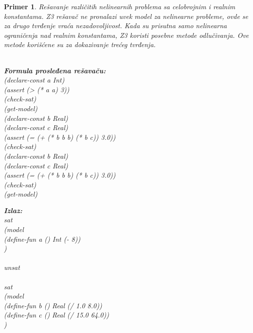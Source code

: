 \documentclass[12pt,oneside]{memoir}
\newcommand\tab[1][0.5cm]{\hspace*{#1}}
\newtheorem{primer}{Primer}
\begin{document}
\begin{primer} Rešavanje različitih nelinearnih problema sa celobrojnim i realnim konstantama. Z3 rešavač ne pronalazi uvek model za nelinearne probleme, ovde se za drugo tvrđenje vraća nezadovoljivost. Kada su prisutna samo nelinearna ograničenja nad realnim konstantama, Z3 koristi posebne metode odlučivanja. Ove metode korišćene su za dokazivanje trećeg tvrđenja.\\ \\
\begin{minipage}[b]{0.43\textwidth}
\textbf{Formula prosleđena rešavaču:}
\\(declare-const a Int)
\\(assert (> (* a a) 3))
\\(check-sat)
\\(get-model)
\\(declare-const b Real)
\\(declare-const c Real)
\\(assert (= (+ (* b b b) (* b c)) 3.0))
\\(check-sat)
\\(declare-const b Real)
\\(declare-const c Real)
\\(assert (= (+ (* b b b) (* b c)) 3.0))
\\(check-sat)
\\(get-model)

\end{minipage}
\hspace{1cm}
\begin{minipage}[t]{0.45\textwidth}
\vspace{-8.5cm}
\textbf{Izlaz:}
\\sat 
\\(model 
\\\tab(define-fun a () Int (- 8))
\\) 
\\
\\unsat 
\\
\\sat 
\\(model 
\\\tab(define-fun b () Real (/ 1.0 8.0)) 
\\\tab(define-fun c () Real (/ 15.0 64.0))
\\)
\end{minipage}
\end{primer}
\end{document}
